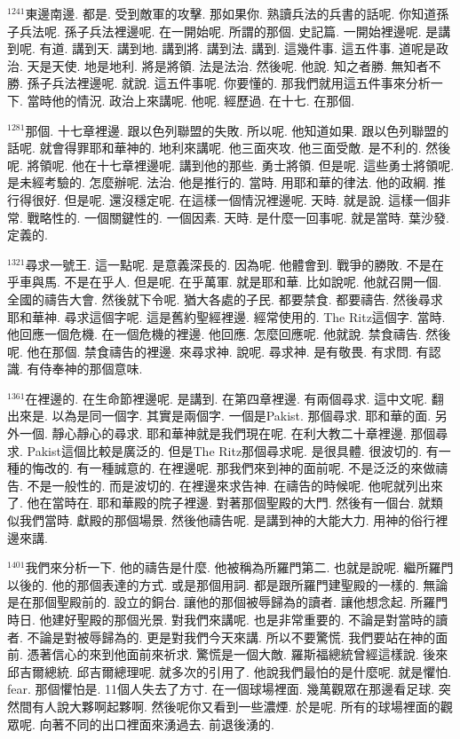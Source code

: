 \documentclass{book}
\begin{document}
$^{1241}$東邊南邊.
都是.
受到敵軍的攻擊.
那如果你.
熟讀兵法的兵書的話呢.
你知道孫子兵法呢.
孫子兵法裡邊呢.
在一開始呢.
所謂的那個.
史記篇.
一開始裡邊呢.
是講到呢.
有道.
講到天.
講到地.
講到將.
講到法.
講到.
這幾件事.
這五件事.
道呢是政治.
天是天使.
地是地利.
將是將領.
法是法治.
然後呢.
他說.
知之者勝.
無知者不勝.
孫子兵法裡邊呢.
就說.
這五件事呢.
你要懂的.
那我們就用這五件事來分析一下.
當時他的情況.
政治上來講呢.
他呢.
經歷過.
在十七.
在那個.

$^{1281}$那個.
十七章裡邊.
跟以色列聯盟的失敗.
所以呢.
他知道如果.
跟以色列聯盟的話呢.
就會得罪耶和華神的.
地利來講呢.
他三面夾攻.
他三面受敵.
是不利的.
然後呢.
將領呢.
他在十七章裡邊呢.
講到他的那些.
勇士將領.
但是呢.
這些勇士將領呢.
是未經考驗的.
怎麼辦呢.
法治.
他是推行的.
當時.
用耶和華的律法.
他的政綱.
推行得很好.
但是呢.
還沒穩定呢.
在這樣一個情況裡邊呢.
天時.
就是說.
這樣一個非常.
戰略性的.
一個關鍵性的.
一個因素.
天時.
是什麼一回事呢.
就是當時.
葉沙發.
定義的.

$^{1321}$尋求一號王.
這一點呢.
是意義深長的.
因為呢.
他體會到.
戰爭的勝敗.
不是在乎車與馬.
不是在乎人.
但是呢.
在乎萬軍.
就是耶和華.
比如說呢.
他就召開一個.
全國的禱告大會.
然後就下令呢.
猶大各處的子民.
都要禁食.
都要禱告.
然後尋求耶和華神.
尋求這個字呢.
這是舊約聖經裡邊.
經常使用的.
The Ritz這個字.
當時.
他回應一個危機.
在一個危機的裡邊.
他回應.
怎麼回應呢.
他就說.
禁食禱告.
然後呢.
他在那個.
禁食禱告的裡邊.
來尋求神.
說呢.
尋求神.
是有敬畏.
有求問.
有認識.
有侍奉神的那個意味.

$^{1361}$在裡邊的.
在生命節裡邊呢.
是講到.
在第四章裡邊.
有兩個尋求.
這中文呢.
翻出來是.
以為是同一個字.
其實是兩個字.
一個是Pakist.
那個尋求.
耶和華的面.
另外一個.
靜心靜心的尋求.
耶和華神就是我們現在呢.
在利大教二十章裡邊.
那個尋求.
Pakist這個比較是廣泛的.
但是The Ritz那個尋求呢.
是很具體.
很波切的.
有一種的悔改的.
有一種誠意的.
在裡邊呢.
那我們來到神的面前呢.
不是泛泛的來做禱告.
不是一般性的.
而是波切的.
在裡邊來求告神.
在禱告的時候呢.
他呢就列出來了.
他在當時在.
耶和華殿的院子裡邊.
對著那個聖殿的大門.
然後有一個台.
就類似我們當時.
獻殿的那個場景.
然後他禱告呢.
是講到神的大能大力.
用神的俗行裡邊來講.

$^{1401}$我們來分析一下.
他的禱告是什麼.
他被稱為所羅門第二.
也就是說呢.
繼所羅門以後的.
他的那個表達的方式.
或是那個用詞.
都是跟所羅門建聖殿的一樣的.
無論是在那個聖殿前的.
設立的銅台.
讓他的那個被辱歸為的讀者.
讓他想念起.
所羅門時日.
他建好聖殿的那個光景.
對我們來講呢.
也是非常重要的.
不論是對當時的讀者.
不論是對被辱歸為的.
更是對我們今天來講.
所以不要驚慌.
我們要站在神的面前.
憑著信心的來到他面前來祈求.
驚慌是一個大敵.
羅斯福總統曾經這樣說.
後來邱吉爾總統.
邱吉爾總理呢.
就多次的引用了.
他說我們最怕的是什麼呢.
就是懼怕.
fear.
那個懼怕是.
11個人失去了方寸.
在一個球場裡面.
幾萬觀眾在那邊看足球.
突然間有人說大夥啊起夥啊.
然後呢你又看到一些濃煙.
於是呢.
所有的球場裡面的觀眾呢.
向著不同的出口裡面來湧過去.
前退後湧的.
\end{document}
